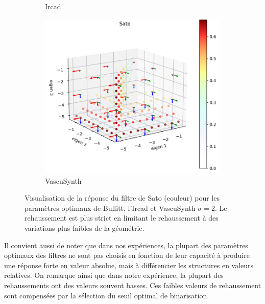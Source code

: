 \begin{figure}[!ht]
\begin{subfigure}[t]{0.45\textwidth}
    \caption{Ircad}
  \end{subfigure}
  
  \begin{subfigure}[t]{0.45\textwidth}
    \includegraphics[width=\textwidth]{Images/Ircad_Sato_BP.png}
    \caption{VascuSynth}
  \end{subfigure}
  \caption{Visualisation de la réponse du filtre de Sato (couleur) pour les paramètres optimaux de Bullitt, l'Ircad et VascuSynth $\sigma=2$. Le rehaussement est plus strict en limitant le rehaussement à des variations plus faibles de la géométrie.}
  \label{fig:exemple_geometry_Sato}
\end{figure}

Il convient aussi de noter que dans nos expériences, la plupart des paramètres optimaux des filtres ne sont pas choisis en fonction de leur capacité à produire une réponse forte en valeur absolue, mais à différencier les structures en valeurs relatives. On remarque ainsi que dans notre expérience, la plupart des rehaussements ont des valeurs souvent basses. Ces faibles valeurs de rehaussement sont compensées par la sélection du seuil optimal de binarisation. 

